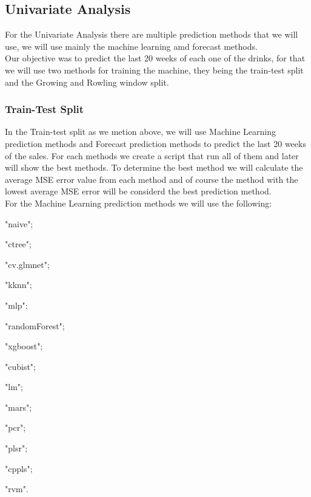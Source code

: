 
\subsection{Univariate Analysis}

\quad For the Univariate Analysis there are multiple prediction methods that we will use, we will use mainly the machine learning amd forecast methods.\\

Our objective was to predict the last 20 weeks of each one of the drinks, for that we will use two methods for training the machine, they being the train-test split and the Growing and Rowling window split.\\

\subsubsection{Train-Test Split}

\quad In the Train-test split as we metion above, we will use Machine Learning prediction methods and Forecast prediction methods to predict the last 20 weeks of the sales. For each methods we create a script that run all of them and later will show the best methods. To determine the best method we will calculate the average MSE error value from each method and of course the method with the lowest average MSE error will be considerd the best prediction method.\\

For the Machine Learning prediction methods we will use the following:

\quad \textbullet "naive";

\quad \textbullet "ctree";

\quad \textbullet "cv.glmnet";

\quad \textbullet "kknn";

\quad \textbullet "mlp";

\quad \textbullet "randomForest";

\quad \textbullet "xgboost";

\quad \textbullet "cubist";

\quad \textbullet "lm";

\quad \textbullet "mars";

\quad \textbullet "pcr";

\quad \textbullet "plsr";

\quad \textbullet "cppls";

\quad \textbullet "rvm".\\

